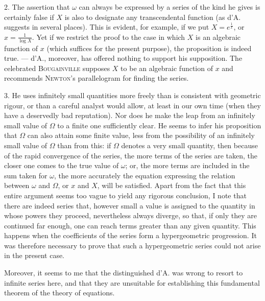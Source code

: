 2. The assertion that $\omega$ can always be expressed by a series of the kind he gives is certainly false if $X$ is also to designate any transcendental function (as d'A. suggests in several places). This is evident, for example, if we put $X=e^{\frac1x}$, or $x=\frac1{\log X}$. Yet if we restrict the proof to the case in which $X$ is an algebraic function of $x$ (which suffices for the present purpose), the proposition is indeed true. --- d'A., moreover, has offered nothing to support his supposition. The celebrated \textsc{Bougainville} supposes $X$ to be an algebraic function of $x$ and recommends \textsc{Newton}'s parallelogram for finding the series.

3. He uses infinitely small quantities more freely than is consistent with geometric rigour, or than a careful analyst would allow, at least in our own time (when they have a deservedly bad reputation). Nor does he make the leap from an infinitely small value of $\Omega$ to a finite one sufficiently clear. He seems to infer his proposition that $\Omega$ can also attain some finite value, less from the possibility of an infinitely small value of $\Omega$ than from this: if $\Omega$ denotes a very small quantity, then because of the rapid convergence of the series, the more terms of the series are taken, the closer one comes to the true value of $\omega$; or, the more terms are included in the sum taken for $\omega$, the more accurately the equation expressing the relation between $\omega$ and $\Omega$, or $x$ and $X$, will be satisfied. Apart from the fact that this entire argument seems too vague to yield any rigorous conclusion, I note that there are indeed series that, however small a value is assigned to the quantity
in whose powers they proceed, nevertheless always diverge, so that, if only they are continued far enough, one can reach terms greater than any given quantity. This happens when the coefficients of the series form a hypergeometric progression. It was therefore necessary to prove that such a hypergeometric series could not arise in the present case.

Moreover, it seems to me that the distinguished d'A. was wrong to resort to infinite series here, and that they are unsuitable for establishing this fundamental theorem of the theory of equations.

